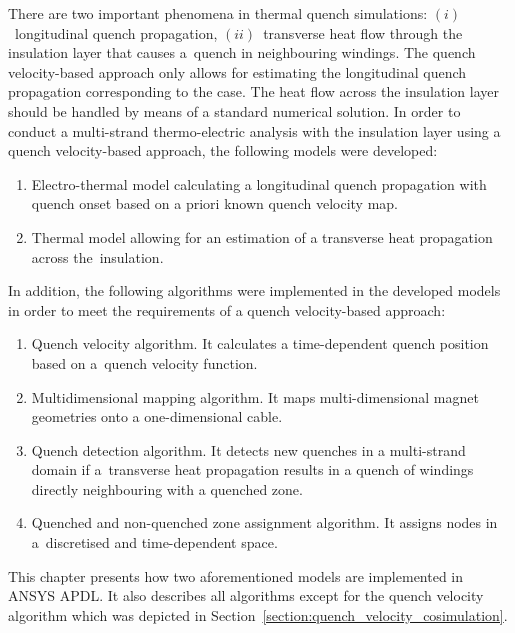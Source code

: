 
There are two important phenomena in thermal quench simulations: $(i)$~longitudinal quench propagation, $(ii)$~transverse heat flow through the insulation layer that causes a~quench in neighbouring windings. The quench velocity-based approach only allows for estimating the longitudinal quench propagation corresponding to the  case. The heat flow across the insulation layer should be handled by means of a standard numerical solution. In order to conduct a multi-strand thermo-electric analysis with the insulation layer using a quench velocity-based approach, the following models were developed:

\begin{enumerate}
    \item Electro-thermal model calculating a longitudinal quench propagation with quench onset based on a priori known quench velocity map.
    \item Thermal model allowing for an estimation of a transverse heat propagation across the~insulation.
\end{enumerate}

In addition, the following algorithms were implemented in the developed models in order to meet the requirements of a quench velocity-based approach:

\begin{enumerate}
    \item Quench velocity algorithm. It calculates a time-dependent quench position based on a~quench velocity function.
    \item Multidimensional mapping algorithm. It maps multi-dimensional magnet geometries onto a one-dimensional cable.
    \item Quench detection algorithm. It detects new quenches in a multi-strand domain if a~transverse heat propagation results in a quench of windings directly neighbouring with a quenched zone.
    \item Quenched and non-quenched zone assignment algorithm. It assigns nodes in a~discretised and time-dependent space.
\end{enumerate}

This chapter presents how two aforementioned models are implemented in ANSYS APDL. It also describes all algorithms except for the quench velocity algorithm which was depicted in Section~\ref{section:quench_velocity_cosimulation}.